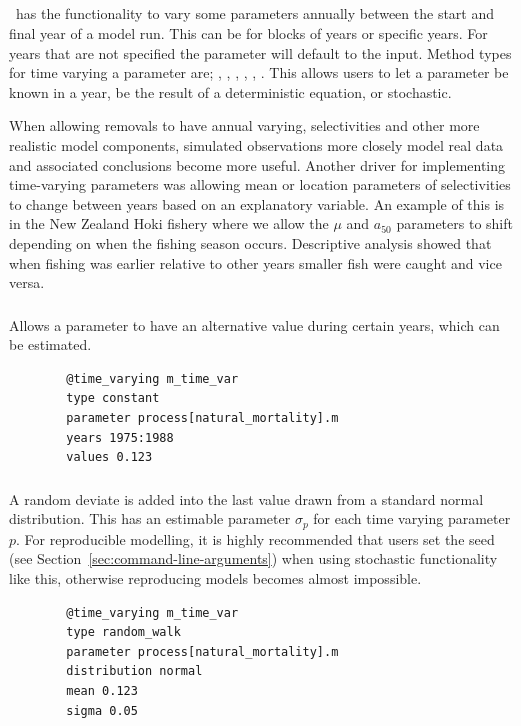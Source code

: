 \subsection{\label{sec:time_var}}

\IBM\ has the functionality to vary some parameters annually between the start and final year of a model run. This can be for blocks of years or specific years. For years that are not specified the parameter will default to the input. Method types for time varying a parameter are; , , , , , . This allows users to let a parameter be known in a year, be the result of a deterministic equation, or stochastic. 

When allowing removals to have annual varying, selectivities and other more realistic model components, simulated observations more closely model real data and associated conclusions become more useful. Another driver for implementing time-varying parameters was allowing mean or location parameters of selectivities to change between years based on an explanatory variable. An example of this is in the New Zealand Hoki fishery where we allow the $\mu$ and $a_{50}$ parameters to shift depending on when the fishing season occurs. Descriptive analysis showed that when fishing was earlier relative to other years smaller fish were caught and vice versa.

\subsubsection[Constant]{}
Allows a parameter to have an alternative value during certain years, which can be estimated.
{\small{\begin{verbatim}
		@time_varying m_time_var
		type constant
		parameter process[natural_mortality].m
		years 1975:1988
		values 0.123
		\end{verbatim}}}


\subsubsection[Random Walk]{}

A random deviate is added into the last value drawn from a standard normal distribution. This has an estimable parameter $\sigma_p$ for each time varying parameter $p$. For reproducible modelling, it is highly recommended that users set the seed (see Section~\ref{sec:command-line-arguments}) when using stochastic functionality like this, otherwise reproducing models becomes almost impossible.
{\small{\begin{verbatim}
		@time_varying m_time_var
		type random_walk
		parameter process[natural_mortality].m
		distribution normal
		mean 0.123
		sigma 0.05
		\end{verbatim}}}


